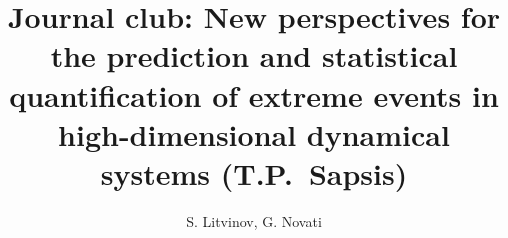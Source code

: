 \author[Litvinov]
{S. Litvinov, G. Novati}
\title{Journal club: New perspectives for the prediction and statistical quantification of extreme events in high-dimensional dynamical systems (T.P.~Sapsis)}
\date{}
